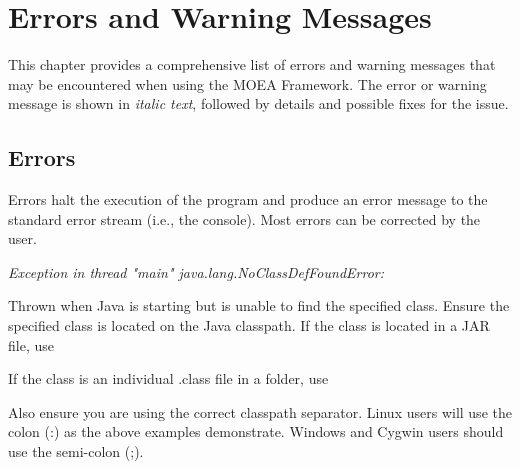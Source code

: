 %
%

\chapter{Errors and Warning Messages}
\label{chpt:errors}

This chapter provides a comprehensive list of errors and warning messages that may be encountered when using the MOEA Framework.  The error or warning message is shown in \textit{italic text}, followed by details and possible fixes for the issue.

\section{Errors}
Errors halt the execution of the program and produce an error message to the standard error stream (i.e., the console).  Most errors can be corrected by the user.
\vspace{\baselineskip}

\noindent
\textit{Exception in thread "main" java.lang.NoClassDefFoundError: }
\begin{indented}
  Thrown when Java is starting but is unable to find the specified class.  Ensure the specified class is located on the Java classpath.  If the class is located in a JAR file, use
  \begin{indented}
  \end{indented}
  If the class is an individual .class file in a folder, use
  \begin{indented}
  \end{indented}
  Also ensure you are using the correct classpath separator.  Linux users will use the colon (:) as the above examples demonstrate.  Windows and Cygwin users should use the
  semi-colon (;).
\end{indented}


